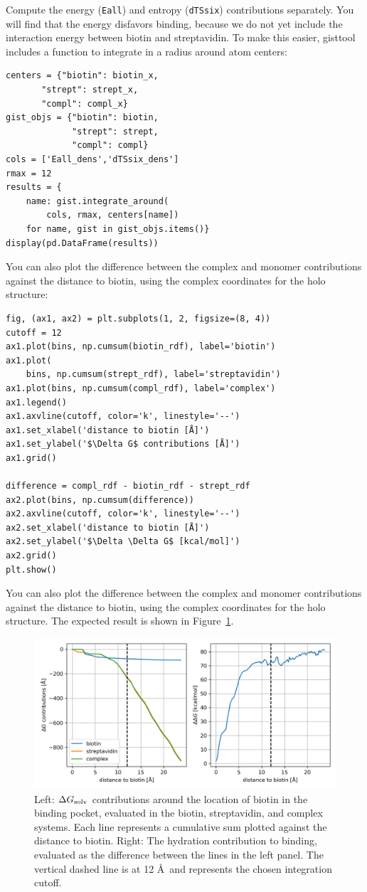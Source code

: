 \documentclass[9pt,tutorial]{livecoms}
\newcommand{\dgsolv}{\Delta G_\textup{solv}}
\newcommand\inlinecode{\texttt}
\begin{document}
Compute the energy (\inlinecode{Eall}) and entropy (\inlinecode{dTSsix}) contributions separately.
You will find that the energy disfavors binding, because we do not yet include the interaction energy between biotin and streptavidin. To make this easier, gisttool includes a function to integrate in a radius around atom centers:
\begin{lstlisting}[style=python]
centers = {"biotin": biotin_x, 
	   "strept": strept_x, 
	   "compl": compl_x}
gist_objs = {"biotin": biotin, 
             "strept": strept, 
             "compl": compl}
cols = ['Eall_dens','dTSsix_dens']
rmax = 12
results = {
    name: gist.integrate_around(
        cols, rmax, centers[name])
    for name, gist in gist_objs.items()}
display(pd.DataFrame(results))

\end{lstlisting}
You can also plot the difference between the complex and monomer contributions against the distance to biotin, using the complex coordinates for the holo structure:
\begin{lstlisting}[style=python]
fig, (ax1, ax2) = plt.subplots(1, 2, figsize=(8, 4))
cutoff = 12
ax1.plot(bins, np.cumsum(biotin_rdf), label='biotin')
ax1.plot(
    bins, np.cumsum(strept_rdf), label='streptavidin')
ax1.plot(bins, np.cumsum(compl_rdf), label='complex')
ax1.legend()
ax1.axvline(cutoff, color='k', linestyle='--')
ax1.set_xlabel('distance to biotin [Å]')
ax1.set_ylabel('$\Delta G$ contributions [Å]')
ax1.grid()

difference = compl_rdf - biotin_rdf - strept_rdf
ax2.plot(bins, np.cumsum(difference))
ax2.axvline(cutoff, color='k', linestyle='--')
ax2.set_xlabel('distance to biotin [Å]')
ax2.set_ylabel('$\Delta \Delta G$ [kcal/mol]')
ax2.grid()
plt.show()
\end{lstlisting}
You can also plot the difference between the complex and monomer contributions against the distance to biotin, using the complex coordinates for the holo structure.
The expected result is shown in Figure~\ref{fig-dg-sums}.
\begin{figure}
	\centering
	\includegraphics[width=1.0\linewidth]{figures/deltaG-difference.png}
	\caption{Left: $\dgsolv$ contributions around the location of biotin in the binding pocket, evaluated in the biotin, streptavidin, and complex systems. Each line represents a cumulative sum plotted against the distance to biotin. Right: The hydration contribution to binding, evaluated as the difference between the lines in the left panel. The vertical dashed line is at 12 \AA\ and represents the chosen integration cutoff.}\label{fig-dg-sums}
\end{figure}
\end{document}
